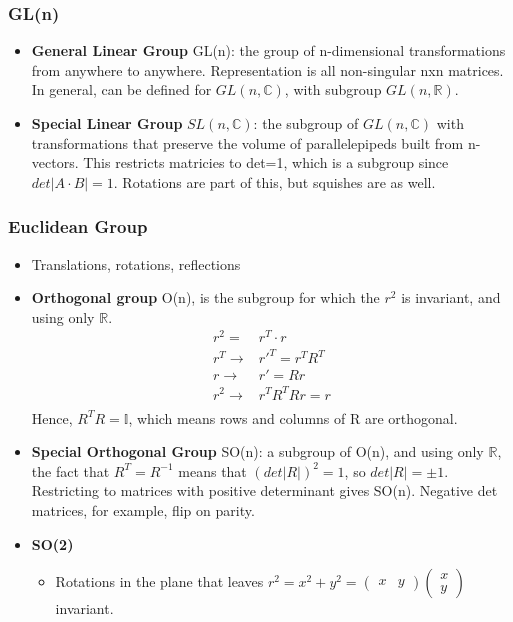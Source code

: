 \subsubsection{GL(n)}
\begin{itemize}
    \item \textbf{General Linear Group} GL(n): the group of n-dimensional transformations from anywhere to anywhere. Representation is all non-singular nxn matrices. In general, can be defined for $GL(n,\mathbb{C})$, with subgroup $GL(n,\mathbb{R})$. \cite{robinson}
    \item \textbf{Special Linear Group} $SL(n,\mathbb{C})$: the subgroup of $GL(n,\mathbb{C})$ with transformations that preserve the volume of parallelepipeds built from n-vectors. This restricts matricies to det=1, which is a subgroup since $det|A\cdot B|=1$. Rotations are part of this, but squishes are as well. \cite{robinson}
\end{itemize}

\subsubsection{Euclidean Group}
\begin{itemize}
    \item Translations, rotations, reflections
    \item \textbf{Orthogonal group} O(n), is the subgroup for which the $r^2$ is invariant, and using only $\mathbb{R}$. \cite{robinson}
    \begin{equation}\begin{split}
    r^2=&r^T\cdot r \\
    r^T\to&r'^T=r^TR^T \\
    r\to&r'=Rr \\
    r^2\to&r^TR^TRr=r \\
    \end{split}\end{equation}
    Hence, $R^TR=\mathbb{I}$, which means rows and columns of R are orthogonal.
    \item \textbf{Special Orthogonal Group} SO(n): a subgroup of O(n), and using only $\mathbb{R}$, the fact that $R^T=R^{-1}$ means that $(det|R|)^2=1$, so $det|R|=\pm1$. Restricting to matrices with positive determinant gives SO(n). Negative det matrices, for example, flip on parity. \cite{robinson}
    \item \textbf{SO(2)} \cite{robinson}
    \begin{itemize}
        \item Rotations in the plane that leaves $r^2=x^2+y^2=\begin{pmatrix}x&y\end{pmatrix}\begin{pmatrix}x\\y\end{pmatrix}$ invariant. \cite{robinson}
    \end{itemize}
\end{itemize}

